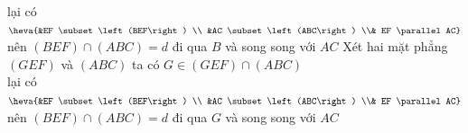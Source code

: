 \begin{ex}
{\begin{itemchoice}
   lại  có
   $\heva{&EF \subset \left(BEF\right) \\ &AC  \subset \left(ABC\right) \\& EF \parallel AC}$ \\
   nên $\left(BEF\right)  \cap \left(ABC\right)=d$ đi qua $B$ và song song với $AC$
   \itemch Xét hai mặt phẳng $\left(GEF\right)$ và $ \left(ABC\right)$ ta có $G  \in \left(GEF\right) \cap \left(ABC\right)$\\
   lại  có
   $\heva{&EF \subset  \left(BEF\right) \\ &AC \subset \left(ABC\right) \\& EF \parallel AC}$ \\
   nên $\left(BEF\right)  \cap \left(ABC\right)=d$ đi qua $G$ và song song với $AC$
  \end{itemchoice}
 } 
\end{ex}

